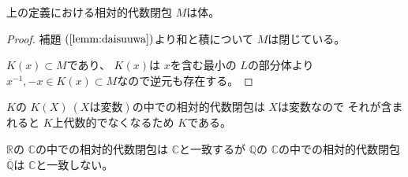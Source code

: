 \documentclass[../master_galois_theory]{subfiles}
\begin{document}
\begin{prop}
  上の定義における相対的代数閉包 $M$は体。
\end{prop}

\begin{proof}
  補題 $(\mathrm{\ref{lemm:daisuuwa}})$より和と積について $M$は閉じている。

  $K(x) \subset M$であり、 $K(x)$は $x$を含む最小の $L$の部分体より $x^{-1} , -x \in K(x) \subset M$なので逆元も存在する。
\end{proof}

\begin{exam}
  $K$の $K(X) \  (Xは変数)$の中での相対的代数閉包は $X$は変数なので
  それが含まれると $K$上代数的でなくなるため $K$である。

  $\mathbb{R}$の $\mathbb{C}$の中での相対的代数閉包は $\mathbb{C}$と一致するが
  $\mathbb{Q}$の $\mathbb{C}$の中での相対的代数閉包 $\overline{\mathbb{Q}}$は
  $\mathbb{C}$と一致しない。
\end{exam}

\clearpage
\end{document}
